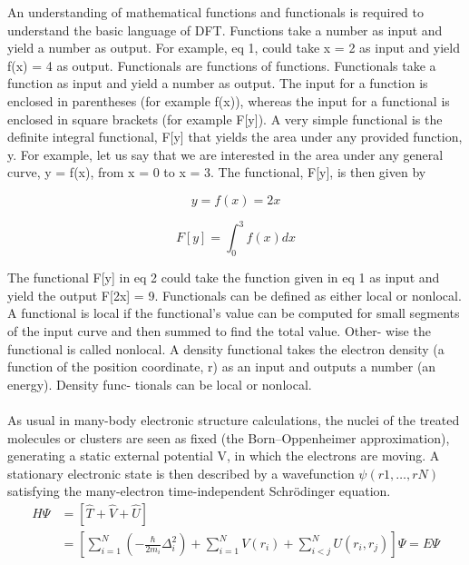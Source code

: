 \documentclass[12pt, letterpaper]{article}
\newcommand*{\1}{\hspace{1pt}}
\begin{document}
    An understanding of mathematical functions and functionals is
    required to understand the basic language of DFT\cite{r15}. Functions
    take a number as input and yield a number as output. For
    example, eq 1, could take x = 2 as input and yield f(x) = 4 as
    output. Functionals are functions of functions. Functionals take
    a function as input and yield a number as output. The input for
    a function is enclosed in parentheses (for example f(x)),
    whereas the input for a functional is enclosed in square brackets
    (for example F[y]). A very simple functional is the deﬁnite
    integral functional, F[y] that yields the area under any provided
    function, y. For example, let us say that we are interested in the
    area under any general curve, y = f(x), from x = 0 to x = 3. The
    functional, F[y], is then given by 
    
    \begin{equation}
        y = f(x) = 2x
    \end{equation}
    
    \begin{equation}
        F[y] = \int ^{3} _{0} f(x) dx
    \end{equation}
    
    The functional F[y] in eq 2 could take the function given in
    eq 1 as input and yield the output F[2x] = 9. Functionals can
    be deﬁned as either local or nonlocal. A functional is local if the
    functional’s value can be computed for small segments of the
    input curve and then summed to ﬁnd the total value. Other-
    wise the functional is called nonlocal. A density functional takes
    the electron density (a function of the position coordinate, r) as
    an input and outputs a number (an energy). Density func-
    tionals can be local or nonlocal. \\ 
     \\ 

    As usual in many-body electronic structure calculations, the nuclei of the treated molecules or clusters are seen as fixed (the Born–Oppenheimer 
    approximation), generating a static external potential V, in which the electrons are moving. A stationary electronic state is then described by a 
    wavefunction $\psi (r1, …, rN)$ satisfying the many-electron time-independent Schrödinger equation. 
    \begin{equation}
        \begin{split}
        \hat{H} \Psi & = \left[\hat{T} + \hat{V} + \hat{U} \right] \\
        & =\left[\sum ^{N} _{i=1}\left(-\frac{\hbar}{2m_{i}}\Delta ^{2}_{i}\right)+ \sum^{N}_{i=1}V(r_{i})+\sum^{N}_{i<j}U(r_{i},r_{j})\right]\Psi = E\Psi
        \end{split}
    \end{equation}
\end{document}
